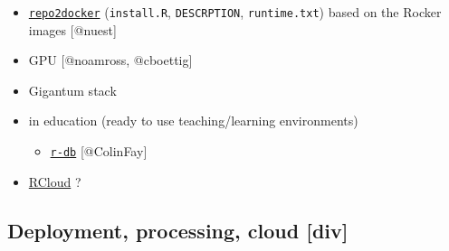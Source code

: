 \begin{itemize}
\tightlist
\item
  \href{https://repo2docker.readthedocs.io/en/latest/config_files.html}{\texttt{repo2docker}}
  (\texttt{install.R}, \texttt{DESCRPTION}, \texttt{runtime.txt}) based
  on the Rocker images {[}@nuest{]}
\item
  GPU {[}@noamross, @cboettig{]}
\item
  Gigantum stack
\item
  in education (ready to use teaching/learning environments)

  \begin{itemize}
  \tightlist
  \item
    \href{https://github.com/ColinFay/r-db}{\texttt{r-db}}
    {[}@ColinFay{]}
  \end{itemize}
\item
  \href{https://github.com/att/rcloud/tree/master/docker}{RCloud} ?
\end{itemize}

\hypertarget{deployment-processing-cloud-div}{%
\subsection{Deployment, processing, cloud
{[}div{]}}\label{deployment-processing-cloud-div}}

